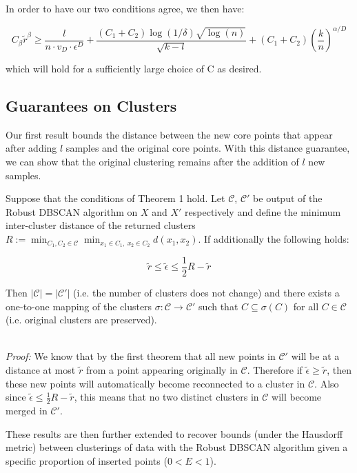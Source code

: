 In order to have our two conditions agree, we then have:

\begin{equation*}
    C_{\beta}\tilde{r}^{\beta} \geq \frac{l}{n\cdot v_D\cdot \epsilon^D} + \frac{(C_1+C_2)\log(1/\delta)\sqrt{\log(n)}}{\sqrt{k-l}} + (C_1+C_2)\left(\frac{k}{n}\right)^{\alpha/D}
\end{equation*}

which will hold for a sufficiently large choice of C as desired.

\subsection{Guarantees on Clusters}

Our first result bounds the distance between the new core points that appear after adding $l$ samples and the original core points. With this distance guarantee, we can show that the original clustering remains after the addition of $l$ new samples.

\begin{theorem}
Suppose that the conditions of Theorem 1 hold. Let $\mathcal{C}$, $\mathcal{C'}$ be output of the Robust DBSCAN algorithm on $X$ and $X'$ respectively and define the minimum inter-cluster distance of the returned clusters $R:=\min_{C_1,C_2 \in \mathcal{C}} \min_{x_1 \in C_1, \: x_2 \in C_2} d(x_1,x_2)$. If additionally the following holds:

\begin{equation*}
    \tilde{r}\leq \tilde{\epsilon}\leq \frac{1}{2}R-\tilde{r}
\end{equation*}

Then $|\mathcal{C}|=|\mathcal{C'}|$ (i.e. the number of clusters does not change) and there exists a one-to-one mapping of the clusters $\sigma: \mathcal{C} \rightarrow \mathcal{C'}$ such that $C\subseteq \sigma(C)$ for all $C\in \mathcal{C}$ (i.e. original clusters are preserved).
\end{theorem}\\

\textit{Proof:} We know that by the first theorem that all new points in $\mathcal{C}'$ will be at a distance at most $\tilde{r}$ from a point appearing originally in $\mathcal{C}$. Therefore if $\tilde{\epsilon}\geq\tilde{r}$, then these new points will automatically become reconnected to a cluster in $\mathcal{C}$. Also since $\tilde{\epsilon}\leq\frac{1}{2}R-\tilde{r}$, this means that no two distinct clusters in $\mathcal{C}$ will become merged in $\mathcal{C}'$.

These results are then further extended to recover bounds (under the Hausdorff metric) between clusterings of data with the Robust DBSCAN algorithm given a specific proportion of inserted points ($0<E<1$).